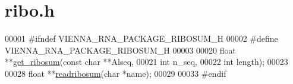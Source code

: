 \hypertarget{ribo_8h_source}{}\section{ribo.\+h}
\label{ribo_8h_source}

\begin{DoxyCode}
00001 \textcolor{preprocessor}{#ifndef VIENNA\_RNA\_PACKAGE\_RIBOSUM\_H}
00002 \textcolor{preprocessor}{#define VIENNA\_RNA\_PACKAGE\_RIBOSUM\_H}
00003 
00020 \textcolor{keywordtype}{float} **\hyperlink{group__consensus__fold_ga1116aed4b2dab5252cd23946d47d52c3}{get\_ribosum}(\textcolor{keyword}{const} \textcolor{keywordtype}{char} **Alseq,
00021                     \textcolor{keywordtype}{int} n\_seq,
00022                     \textcolor{keywordtype}{int} length);
00023 
00028 \textcolor{keywordtype}{float}   **\hyperlink{group__consensus__fold_ga5e125c9586fcd4e2e1559fe76f7289cc}{readribosum}(\textcolor{keywordtype}{char} *name);
00029 
00033 \textcolor{preprocessor}{#endif}
\end{DoxyCode}
